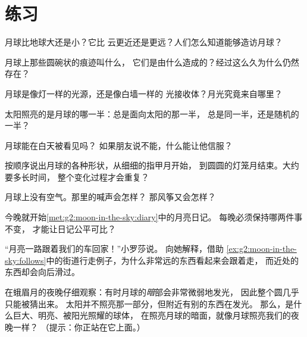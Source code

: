\section{练习}

\begin{exercise}[$\star$]\label{exo:g2:moon-in-the-sky:1}
月球比地球大还是小？它比
云更近还是更远？人们怎么知道能够造访月球？
\end{exercise}

\begin{exercise}[$\star$]\label{exo:g2:moon-in-the-sky:2}
月球上那些圆碗状的痕迹叫什么，
它们是由什么造成的？经过这么久为什么仍然存在？
\end{exercise}

\begin{exercise}[$\star$]\label{exo:g2:moon-in-the-sky:3}
月球是像灯一样的光源，还是像白墙一样的
光接收体？月光究竟来自哪里？
\end{exercise}

\begin{exercise}[$\star$]\label{exo:g2:moon-in-the-sky:4}
太阳照亮的是月球的哪一半：总是面向太阳的那一半，
总是同一半，还是随机的一半？
\end{exercise}

\begin{exercise}[$\star$]\label{exo:g2:moon-in-the-sky:5}
月球能在白天被看见吗？
如果朋友说不能，什么能让他信服？
\end{exercise}

\begin{exercise}[$\star$]\label{exo:g2:moon-in-the-sky:6}
按顺序说出月球的各种形状，从细细的指甲月开始，
到圆圆的灯笼月结束。大约要多长时间，
整个变化过程才会重复？
\end{exercise}

\begin{exercise}[$\star$]\label{exo:g2:moon-in-the-sky:7}
月球上没有空气。那里的喊声会怎样？
那风筝又会怎样？
\end{exercise}

\begin{exercise}[$\star$]\label{exo:g2:moon-in-the-sky:8}
今晚就开始\cref{met:g2:moon-in-the-sky:diary}中的月亮日记。
每晚必须保持哪两件事不变，
才能让日记公平可比？
\end{exercise}

\begin{exercise}[$\star\star$]\label{exo:g2:moon-in-the-sky:9}
“月亮一路跟着我们的车回家！”小罗莎说。
向她解释，借助
\cref{ex:g2:moon-in-the-sky:follows}中的街道行走例子，为什么非常远的东西看起来会跟着走，
而近处的东西却会向后滑过。
\end{exercise}

\begin{exercise}[$\star\star$]\label{exo:g2:moon-in-the-sky:10}
在蛾眉月的夜晚仔细观察：有时月球的\emph{暗}部会非常微弱地发光，
因此整个圆几乎只能被猜出来。
太阳并不照亮那一部分，但附近有别的东西在发光。
那么，是什么巨大、明亮、被阳光照耀的球体，
在照亮月球的暗面，就像月球照亮我们的夜晚一样？
（提示：你正站在它上面。）
\end{exercise}

